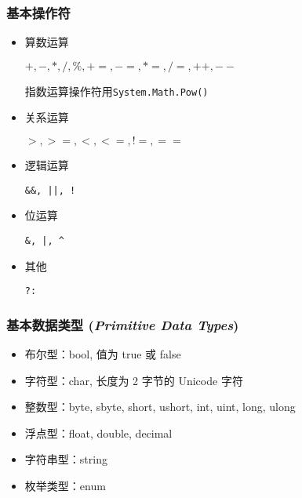 \begin{frame}
\frametitle{基本操作符}
\begin{itemize}
\item 算数运算 \par
\texttt{$+,-,*,/,\%, +=,-=,*=,/=,++,--$}\par
指数运算操作符用\texttt{System.Math.Pow()}
\item 关系运算 \par
\texttt{$>, >=, <, <=, !=, ==$}
\item 逻辑运算 \par
\texttt{\&\&, ||, !}
\item 位运算 \par
\texttt{\&, |, \^}
\item 其他 \par
\texttt{?:}
\end{itemize}

\end{frame}


\begin{frame}
\frametitle{基本数据类型  (\textit{Primitive Data Types})}
\begin{itemize}
    \setlength{\itemsep}{8pt plus 1pt}
\item 布尔型：bool, 值为 true 或 false
\item 字符型：char, 长度为 2 字节的 Unicode 字符
\item 整数型：byte, sbyte, short, ushort, int, uint, long, ulong
\item 浮点型：float, double, decimal
\item 字符串型：string
\item 枚举类型：enum
\end{itemize}
\end{frame}


